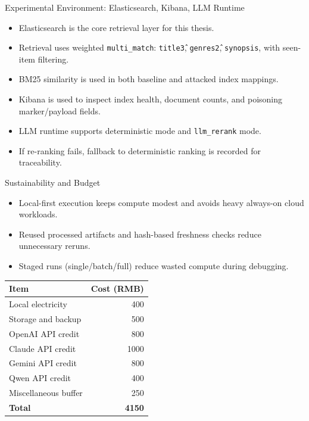 \documentclass[aspectratio=169,11pt]{beamer}
\begin{document}
\begin{frame}{Experimental Environment: Elasticsearch, Kibana, LLM Runtime}
\begin{itemize}
  \item Elasticsearch is the core retrieval layer for this thesis.
  \item Retrieval uses weighted \texttt{multi\_match}: \texttt{title\^3}, \texttt{genres\^2}, \texttt{synopsis}, with seen-item filtering.
  \item BM25 similarity is used in both baseline and attacked index mappings.
  \item Kibana is used to inspect index health, document counts, and poisoning marker/payload fields.
  \item LLM runtime supports deterministic mode and \texttt{llm\_rerank} mode.
  \item If re-ranking fails, fallback to deterministic ranking is recorded for traceability.
\end{itemize}
\end{frame}

\begin{frame}{Sustainability and Budget}
\begin{itemize}
  \item Local-first execution keeps compute modest and avoids heavy always-on cloud workloads.
  \item Reused processed artifacts and hash-based freshness checks reduce unnecessary reruns.
  \item Staged runs (single/batch/full) reduce wasted compute during debugging.
\end{itemize}

\vspace{0.4em}
\small
\begin{tabular}{p{}r}
\toprule
Item & Cost (RMB) \\
\midrule
Local electricity & 400 \\
Storage and backup & 500 \\
OpenAI API credit & 800 \\
Claude API credit & 1000 \\
Gemini API credit & 800 \\
Qwen API credit & 400 \\
Miscellaneous buffer & 250 \\
\midrule
\textbf{Total} & \textbf{4150} \\
\bottomrule
\end{tabular}
\end{frame}
\end{document}
